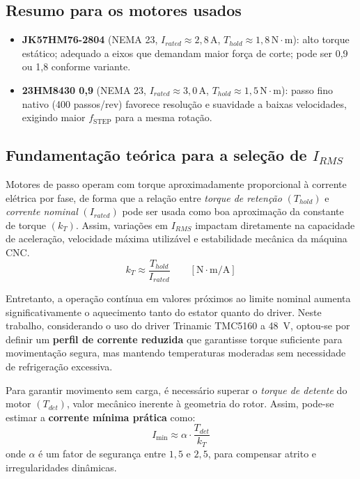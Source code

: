 \subsection{Resumo para os motores usados}
\begin{itemize}
	\item \textbf{JK57HM76-2804} (NEMA 23, \(I_{rated}\approx 2{,}8\,\mathrm{A}\), \(T_{hold}\approx 1{,}8\,\mathrm{N\cdot m}\)): alto torque estático; adequado a eixos que demandam maior força de corte; pode ser 0{,}9\textdegree{} ou 1{,}8\textdegree{} conforme variante.
	\item \textbf{23HM8430 0{,}9\textdegree{}} (NEMA 23, \(I_{rated}\approx 3{,}0\,\mathrm{A}\), \(T_{hold}\approx 1{,}5\,\mathrm{N\cdot m}\)): passo fino nativo (400 passos/rev) favorece resolução e suavidade a baixas velocidades, exigindo maior \(f_{\text{STEP}}\) para a mesma rotação.
\end{itemize}

\subsection{Fundamentação teórica para a seleção de \texorpdfstring{$I_{RMS}$}{IRMS}}
Motores de passo operam com torque aproximadamente proporcional à corrente elétrica por fase, de forma que a relação entre \textit{torque de retenção} \((T_{hold})\) e \textit{corrente nominal} \((I_{rated})\) pode ser usada como boa aproximação da constante de torque \((k_T)\). Assim, variações em \(I_{RMS}\) impactam diretamente na capacidade de aceleração, velocidade máxima utilizável e estabilidade mecânica da máquina CNC.
\[
k_T \approx \frac{T_{hold}}{I_{rated}}
\qquad [\mathrm{N \cdot m / A}]
\]

Entretanto, a operação contínua em valores próximos ao limite nominal aumenta significativamente o aquecimento tanto do estator quanto do driver. Neste trabalho, considerando o uso do driver Trinamic TMC5160 a \SI{48}{\volt}, optou-se por definir um \textbf{perfil de corrente reduzida} que garantisse torque suficiente para movimentação segura, mas mantendo temperaturas moderadas sem necessidade de refrigeração excessiva.

Para garantir movimento sem carga, é necessário superar o \textit{torque de detente} do motor \((T_{det})\), valor mecânico inerente à geometria do rotor. Assim, pode-se estimar a \textbf{corrente mínima prática} como:
\[
I_{\text{min}} \approx \alpha \cdot \frac{T_{det}}{k_T}
\]
onde \(\alpha\) é um fator de segurança entre \(1{,}5\) e \(2{,}5\), para compensar atrito e irregularidades dinâmicas.

